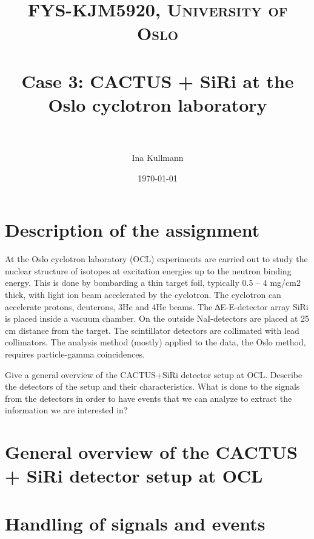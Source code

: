 \documentclass[paper=a4, fontsize=11pt]{scrartcl} %
\title{	
\normalfont \normalsize 
\textsc{FYS-KJM5920, University of Oslo} \\ [25pt] %
\horrule{0.5pt} \\[0.4cm] %
\huge Case 3: CACTUS + SiRi at the Oslo cyclotron laboratory  \\ %
\horrule{2pt} \\[0.5cm] %
}
\author{Ina Kullmann} %
\date{\normalsize\today} %
\numberwithin{equation}{section} %
\numberwithin{figure}{section} %
\numberwithin{table}{section} %
\begin{document}
\maketitle %



\section*{Description of the assignment}

At the Oslo cyclotron laboratory (OCL) experiments are carried out to study the nuclear structure of isotopes at excitation energies up to the neutron binding energy. This is done by bombarding a thin target foil, typically 0.5 – 4 mg/cm2 thick, with light ion beam accelerated by the cyclotron. The cyclotron can accelerate protons, deuterons, 3He and 4He beams. The ∆E-E-detector array SiRi is placed inside a vacuum chamber. On the outside NaI-detectors are placed at 25 cm distance from the target. The scintillator detectors are collimated with lead collimators. The analysis method (mostly) applied to the data, the Oslo method, requires particle-gamma coincidences.

Give a general overview of the CACTUS+SiRi detector setup at OCL. Describe the detectors of the setup and their characteristics. What is done to the signals from the detectors in order to have events that we can analyze to extract the information we are interested in?



\section*{General overview of the CACTUS + SiRi detector setup at OCL}









\section*{Handling of signals and events}
\end{document}
